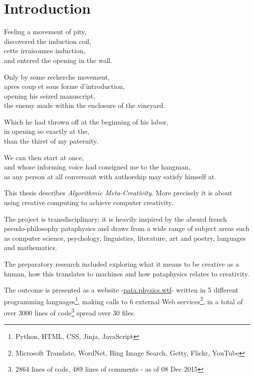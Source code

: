 
\chapter{Introduction}
\label{ch:introduction}

\startcontents[chapters]

\vfill

Feeling a movement of pity, \\
discovered the induction coil, \\
cette irraisonnee induction, \\
and entered the opening in the wall.

Only by some recherche movement, \\
apres coup et sous forme d'introduction, \\
opening his seized manuscript, \\
the enemy made within the enclosure of the vineyard.

Which he had thrown off at the beginning of his labor, \\
in opening so exactly at the, \\
than the thirst of my paternity.

We can then start at once, \\
and whose informing voice had consigned me to the hangman, \\
as any person at all conversant with authorship may satisfy himself at.

\newpage
\minicontents
\spirals

This thesis describes \textit{Algorithmic Meta-Creativity}. More precisely it is about using creative computing to achieve computer creativity.

The project is transdisciplinary; it is heavily inspired by the absurd french pseudo-philosophy pataphysics and draws from a wide range of subject areas such as computer science, psychology, linguistics, literature, art and poetry, languages and mathematics.

The preparatory research included exploring what it means to be creative as a human, how this translates to machines and how pataphysics relates to creativity.

The outcome is presented as a website -\url{pata.physics.wtf}- written in 5 different programming languages\footnote{Python, HTML, CSS, Jinja, JavaScript}, making calls to 6 external Web services\footnote{Microsoft Translate, WordNet, Bing Image Search, Getty, Flickr, YouTube}, in a total of over 3000 lines of code\footnote{2864 lines of code, 489 lines of comments - as of 08 Dec 2015} spread over 30 files.

